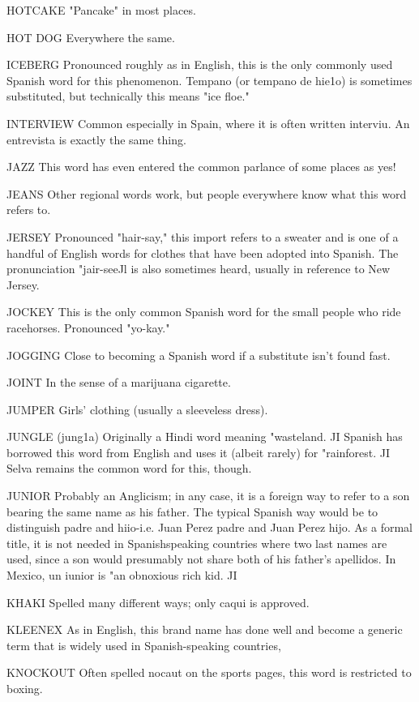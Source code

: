 HOTCAKE "Pancake" in most places.

HOT DOG Everywhere the same.

ICEBERG Pronounced roughly as in English, this is the only
commonly used Spanish word for this phenomenon. Tempano (or tempano de hie1o) is sometimes substituted, but technically this means
"ice floe."

INTERVIEW Common especially in Spain, where it is often
written interviu. An entrevista is exactly the same thing.

JAZZ This word has even entered the common parlance of
some places as yes!

JEANS Other regional words work, but people everywhere
know what this word refers to.

JERSEY Pronounced "hair-say," this import refers to a
sweater and is one of a handful of English words for clothes that
have been adopted into Spanish. The pronunciation "jair-seeJl is also
sometimes heard, usually in reference to New Jersey.

JOCKEY This is the only common Spanish word for the
small people who ride racehorses. Pronounced "yo-kay."

JOGGING Close to becoming a Spanish word if a substitute
isn't found fast.

JOINT In the sense of a marijuana cigarette.

JUMPER Girls' clothing (usually a sleeveless dress).

JUNGLE (jung1a) Originally a Hindi word meaning "wasteland. JI Spanish has borrowed this word from English and uses it (albeit
rarely) for "rainforest. JI Selva remains the common word for this, though.

JUNIOR Probably an Anglicism; in any case, it is a foreign
way to refer to a son bearing the same name as his father. The typical
Spanish way would be to distinguish padre and hiio-i.e. Juan Perez
padre and Juan Perez hijo. As a formal title, it is not needed in Spanishspeaking countries where two last names are used, since a son would
presumably not share both of his father's apellidos. In Mexico, un iunior is "an obnoxious rich kid. JI

KHAKI Spelled many different ways; only caqui is approved.

KLEENEX As in English, this brand name has done well
and become a generic term that is widely used in Spanish-speaking
countries,

KNOCKOUT Often spelled nocaut on the sports pages, this
word is restricted to boxing.

